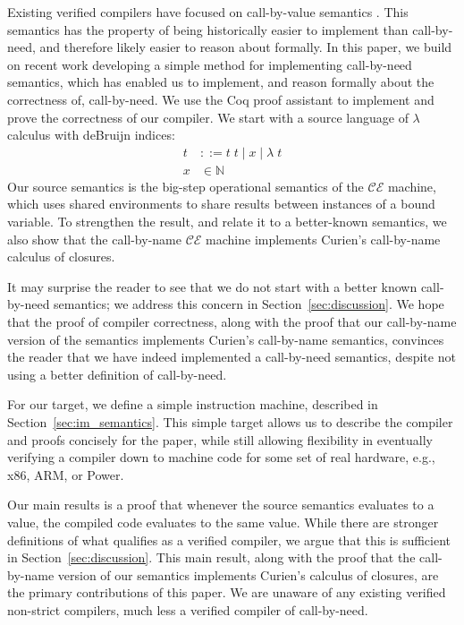 Existing verified compilers have focused on call-by-value semantics
\cite{chlipala2007certified, leroy2012compcert, cakeml14}. This semantics has
the property of being historically easier to implement than call-by-need, and
therefore likely easier to reason about formally. In this paper, we build on
recent work developing a simple method for implementing call-by-need semantics,
which has enabled us to implement, and reason formally about the correctness of,
call-by-need. We use the Coq proof assistant \cite{barras1997coq} to implement
and prove the correctness of our compiler. We start with a source language of
$\lambda$ calculus with deBruijn indices:
\begin{align*}
 t &::= t \; t \; | \; x \; | \;  \lambda \; t \\
 x &\in \mathbb{N}
\end{align*}
Our source semantics is the big-step operational semantics of the $\mathcal{CE}$
machine, which uses shared environments to share results between instances of a
bound variable. To strengthen the result, and relate it to a better-known
semantics, we also show that the call-by-name $\mathcal{CE}$ machine implements
Curien's call-by-name calculus of closures. 

It may surprise the reader to see that we do not start with a better known
call-by-need semantics; we address this concern in
Section~\ref{sec:discussion}.  We hope that the proof of compiler correctness,
along with the proof that our call-by-name version of the semantics implements
Curien's call-by-name semantics, convinces the reader that we have indeed
implemented a call-by-need semantics, despite not using a better definition of
call-by-need. 

For our target, we define a simple instruction machine, described in
Section~\ref{sec:im_semantics}. This simple target allows us to describe the
compiler and proofs concisely for the paper, while still allowing
flexibility in eventually verifying a compiler down to machine code for some
set of real hardware, e.g., x86, ARM, or Power. 

Our main results is a proof that whenever the source semantics evaluates to a
value, the compiled code evaluates to the same value. While there are stronger
definitions of what qualifies as a verified compiler, we argue that this is
sufficient in Section~\ref{sec:discussion}. This main result, along with the
proof that the call-by-name version of our semantics implements Curien's
calculus of closures, are the primary contributions of this paper. We are
unaware of any existing verified non-strict compilers, much less a verified
compiler of call-by-need. 

